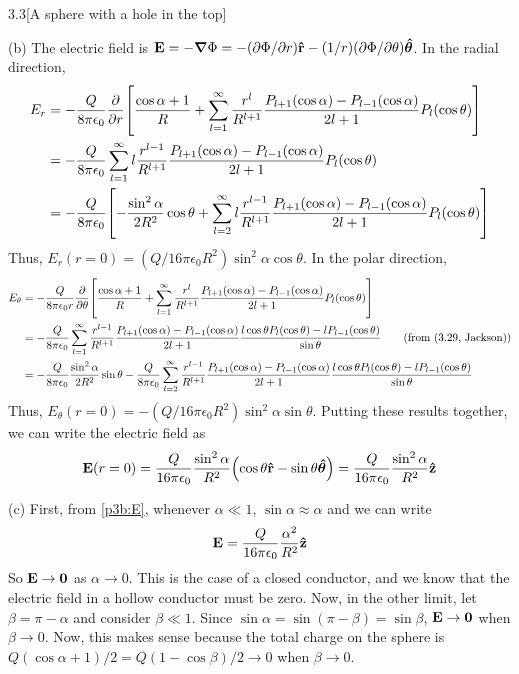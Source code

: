 \documentclass[12pt]{article}
\begin{document}
\begin{problem}{3.3}[A sphere with a hole in the top]
\begin{solution}
(b) The electric field is $\vb{E}=-\grad\Phi=-(\partial\Phi /\partial r)\vb{\hat{r}}-(1
/r)(\partial\Phi /\partial\theta)\bm{\hat{\theta}}$. In the radial direction,
\begin{align}
    E_r&=
    -\frac{Q}{8\pi\epsilon_0}\frac{\partial}{\partial r}\qty[
        \frac{\cos\alpha+1}{R}+\sum_{l=1}^\infty\frac{r^l}{R^{l+1}}\frac{P_{l+1}(\cos\alpha)-P_{l-1}(\cos\alpha)}{2l+1}P_l(\cos\theta)
    ]\notag\\
       &=-\frac{Q}{8\pi\epsilon_0}\sum_{l=1}^\infty l\frac{r^{l-1}}{R^{l+1}}
        \frac{P_{l+1}(\cos\alpha)-P_{l-1}(\cos\alpha)}{2l+1}P_l(\cos\theta)\notag\\
       &=-\frac{Q}{8\pi\epsilon_0}\qty[
        -\frac{\sin^2\alpha}{2R^2}\cos\theta+\sum_{l=2}^\infty
            l\frac{r^{l-1}}{R^{l+1}}\frac{P_{l+1}(\cos\alpha)-P_{l-1}(\cos\alpha)}{2l+1}P_l(\cos\theta)
       ]
\end{align}
Thus, $E_r(r=0)=(Q /16\pi\epsilon_0R^2)\sin^2\alpha\cos\theta$. In the polar
direction,
\begin{align}
    E_\theta&=-\frac{Q}{8\pi\epsilon_0 r}\frac{\partial}{\partial\theta}
    \qty[
    \frac{\cos\alpha+1}{R}+\sum_{l=1}^\infty\frac{r^l}{R^{l+1}}\frac{P_{l+1}(\cos\alpha)-P_{l-1}(\cos\alpha)}{2l+1}P_l(\cos\theta)
    ]\notag\\
    &=-\frac{Q}{8\pi\epsilon_0}\sum_{l=1}^\infty\frac{r^{l-1}}{R^{l+1}}\frac{P_{l+1}(\cos\alpha)-P_{l-1}(\cos\alpha)}{2l+1}\frac{l\cos\theta
    P_{l}(\cos\theta)-lP_{l-1}(\cos\theta)}{\sin\theta}\tag{from (3.29,
Jackson)}\\
    &=-\frac{Q}{8\pi\epsilon_0}\frac{\sin^2\alpha}{2R^2}\sin\theta
    -\frac{Q}{8\pi\epsilon_0}\sum_{l=2}^\infty
        \frac{r^{l-1}}{R^{l+1}}\frac{P_{l+1}(\cos\alpha)-P_{l-1}(\cos\alpha)}{2l+1}\frac{l\cos\theta
    P_{l}(\cos\theta)-lP_{l-1}(\cos\theta)}{\sin\theta}
\end{align}
Thus, $E_\theta(r=0)=-(Q /16\pi\epsilon_0R^2)\sin^2\alpha\sin\theta$. Putting
these results together, we can write the electric field as
\begin{equation}\label{p3b:E}
    \vb{E}(r=0)=\frac{Q}{16\pi\epsilon_0}\frac{\sin^2\alpha}{R^2}\qty(\cos\theta\vb{\hat{r}}-\sin\theta\bm{\hat{\theta}})=\frac{Q}{16\pi\epsilon_0}\frac{\sin^2\alpha}{R^2}\vb{\hat{z}}
\end{equation}

(c) First, from \eqref{p3b:E}, whenever $\alpha\ll 1$,
$\sin\alpha\approx\alpha$ and we can write
\begin{equation}
    \vb{E}=\frac{Q}{16\pi\epsilon_0}\frac{\alpha^2}{R^2}\vb{\hat{z}} 
\end{equation}
So $\vb{E}\to\vb{0}$ as $\alpha\to 0$. This is the case of a closed conductor,
and we know that the electric field in a hollow conductor must be zero. Now, in
the other limit, let $\beta=\pi-\alpha$ and consider $\beta\ll 1$. Since
$\sin\alpha=\sin(\pi-\beta)=\sin\beta$, $\vb{E}\to\vb{0}$ when $\beta\to 0$.
Now, this makes sense because the total charge on the sphere is
$Q(\cos\alpha+1) /2=Q(1-\cos\beta) /2\to 0$ when $\beta\to 0$.


\end{solution}
\end{problem}
\end{document}
